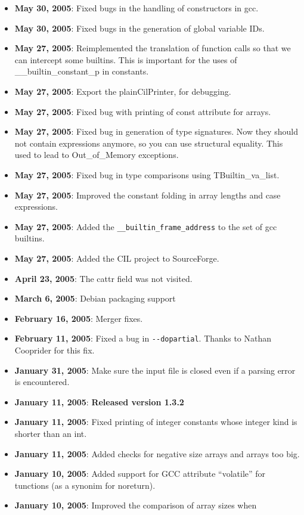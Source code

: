 \documentclass{article}
\def\t#1{{\tt #1}}
\begin{document}
\begin{itemize}
\item {\bf May 30, 2005}: Fixed bugs in the handling of constructors in gcc.
\item {\bf May 30, 2005}: Fixed bugs in the generation of global variable IDs.
\item {\bf May 27, 2005}: Reimplemented the translation of function calls so
  that we can intercept some builtins. This is important for the uses of
  \_\_builtin\_constant\_p in constants. 
\item {\bf May 27, 2005}: Export the plainCilPrinter, for debugging.
\item {\bf May 27, 2005}: Fixed bug with printing of const attribute for
  arrays. 
\item {\bf May 27, 2005}: Fixed bug in generation of type signatures. Now they
  should not contain expressions anymore, so you can use structural equality.
  This used to lead to Out\_of\_Memory exceptions.
\item {\bf May 27, 2005}: Fixed bug in type comparisons using
  TBuiltin\_va\_list.
\item {\bf May 27, 2005}: Improved the constant folding in array lengths and
  case expressions. 
\item {\bf May 27, 2005}: Added the \t{\_\_builtin\_frame\_address} to the set
  of gcc builtins.
\item {\bf May 27, 2005}: Added the CIL project to SourceForge.
\item {\bf April 23, 2005}: The cattr field was not visited.
\item {\bf March 6, 2005}: Debian packaging support
\item {\bf February 16, 2005}: Merger fixes.
\item {\bf February 11, 2005}: Fixed a bug in \t{-{}-dopartial}. Thanks to
Nathan Cooprider for this fix. 
\item {\bf January 31, 2005}: Make sure the input file is closed even if a
  parsing error is encountered. 
\item {\bf January 11, 2005}: {\bf Released version 1.3.2}
\item {\bf January 11, 2005}: Fixed printing of integer constants whose
  integer kind is shorter than an int. 
\item {\bf January 11, 2005}: Added checks for negative size arrays and arrays
  too big. 
\item {\bf January 10, 2005}: Added support for GCC attribute ``volatile'' for
  tunctions (as a synonim for noreturn). 
\item {\bf January 10, 2005}: Improved the comparison of array sizes when

\end{itemize}
\end{document}
